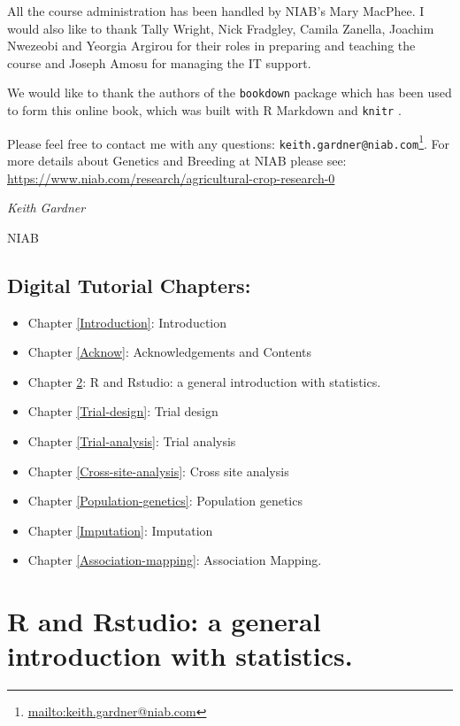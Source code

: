 \documentclass[
]{book}
\renewcommand{\href}[2]{#2\footnote{\url{#1}}}
\begin{document}
All the course administration has been handled by NIAB's Mary MacPhee. I would also like to thank Tally Wright, Nick Fradgley, Camila Zanella, Joachim Nwezeobi and Yeorgia Argirou for their roles in preparing and teaching the course and Joseph Amosu for managing the IT support.

We would like to thank the authors of the \texttt{bookdown} package \citep{R-bookdown} which has been used to form this online book, which was built with R Markdown and \texttt{knitr} \citep{xie2015}.

Please feel free to contact me with any questions: \href{mailto:keith.gardner@niab.com}{\nolinkurl{keith.gardner@niab.com}}. For more details about Genetics and Breeding at NIAB please see: \url{https://www.niab.com/research/agricultural-crop-research-0}

\emph{Keith Gardner}

NIAB

\hypertarget{digital-tutorial-chapters}{%
\section{Digital Tutorial Chapters:}\label{digital-tutorial-chapters}}

\begin{itemize}
\item
  Chapter \ref{Introduction}: Introduction
\item
  Chapter \ref{Acknow}: Acknowledgements and Contents
\item
  Chapter \ref{R-and-stats}: R and Rstudio: a general introduction with statistics.
\item
  Chapter \ref{Trial-design}: Trial design
\item
  Chapter \ref{Trial-analysis}: Trial analysis
\item
  Chapter \ref{Cross-site-analysis}: Cross site analysis
\item
  Chapter \ref{Population-genetics}: Population genetics
\item
  Chapter \ref{Imputation}: Imputation
\item
  Chapter \ref{Association-mapping}: Association Mapping.
\end{itemize}

\hypertarget{R-and-stats}{%
\chapter{R and Rstudio: a general introduction with statistics.}\label{R-and-stats}}
\end{document}
